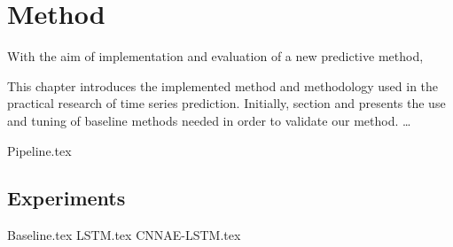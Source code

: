 \chapter{Method}
\label{cha:Method}

With the aim of implementation and evaluation of a new predictive method,

This chapter introduces the implemented method and methodology used in the practical research of time series prediction.
Initially, section  and  presents the use and tuning of baseline methods needed in order to validate our method.
\dots

{Pipeline.tex}

\section{Experiments}
{Baseline.tex}
{LSTM.tex}
{CNNAE-LSTM.tex}

